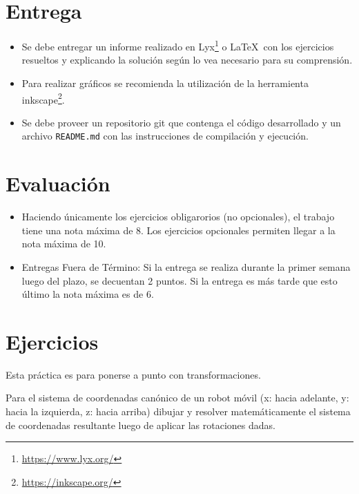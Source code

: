 \documentclass[tp]{lcc}
\begin{document}
\maketitle

\section{Entrega}
\begin{itemize}
    \item Se debe entregar un informe realizado en Lyx\footnote{\url{https://www.lyx.org/}} o \LaTeX\ con los ejercicios resueltos y explicando la solución según lo vea necesario para su comprensión.
    
    \item Para realizar gráficos se recomienda la utilización de la herramienta inkscape\footnote{\url{https://inkscape.org/}}.
    
    \item Se debe proveer un repositorio git que contenga el código desarrollado y un archivo \lstinline{README.md} con las instrucciones de compilación y ejecución.
\end{itemize}

\section{Evaluación}
\begin{itemize}
    \item Haciendo únicamente los ejercicios obligarorios (no opcionales), el trabajo tiene una nota máxima de 8. Los ejercicios opcionales permiten llegar a la nota máxima de 10.
    \item Entregas Fuera de Término: Si la entrega se realiza durante la primer semana luego del plazo, se decuentan 2 puntos. Si la entrega es más tarde que esto último la nota máxima es de 6.
\end{itemize}

\section{Ejercicios}
Esta práctica es para ponerse a punto con transformaciones.

\ejercicio Para el sistema de coordenadas canónico de un robot móvil (x: hacia adelante, y: hacia la izquierda, z: hacia arriba) dibujar y resolver matemáticamente el sistema de coordenadas resultante luego de aplicar las rotaciones dadas.
\end{document}
